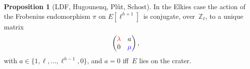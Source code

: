\documentclass[10pt]{beamer}
\theoremstyle{plain}
\theoremstyle{definition}
\theoremstyle{definition}
\theoremstyle{definition}
\newtheorem{prop}[thm]{Proposition}
\theoremstyle{definition}
\theoremstyle{remark}
\theoremstyle{remark}
\begin{document}
\begin{frame}

  \begin{prop}[LDF, Hugounenq, Plût, Schost]\label{prop:matrice-Frobenius}
    In the Elkies case the action of the Frobenius endomorphism $\pi$ on $E[\ell^{h+1}]$~is conjugate, over~$\mathbb{Z}_{\ell}$,
    to a unique matrix \[\left ( \begin{matrix}{\color{red}\lambda} & a\\ 0 &
          {\color{blue}\mu} \end{matrix}\right ), \]  with $a \in \{ 1,\ell, \dots,
    \ell^{h-1}, 0  \}$, and $a = 0$ iff~$E$ lies on the crater.
  \end{prop}

  \begin{figure}
    \begin{center}


\end{center}
\end{figure}
\end{frame}
\end{document}
